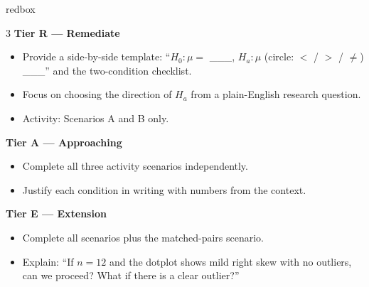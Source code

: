 \documentclass[10pt]{article}
\begin{document}
\begin{skillbox}{redbox}
\begin{multicols}{3}
    \textbf{Tier R --- Remediate}
    \begin{itemize}
        \item Provide a side-by-side template: ``$H_0: \mu =$ \_\_\_, $H_a: \mu$ (circle:
              $<$ / $>$ / $\ne$) \_\_\_'' and the two-condition checklist.
        \item Focus on choosing the direction of $H_a$ from a plain-English research question.
        \item Activity: Scenarios A and B only.
    \end{itemize}
    \columnbreak
    \textbf{Tier A --- Approaching}
    \begin{itemize}
        \item Complete all three activity scenarios independently.
        \item Justify each condition in writing with numbers from the context.
    \end{itemize}
    \columnbreak
    \textbf{Tier E --- Extension}
    \begin{itemize}
        \item Complete all scenarios plus the matched-pairs scenario.
        \item Explain: ``If $n = 12$ and the dotplot shows mild right skew with no outliers,
              can we proceed? What if there is a clear outlier?''
    \end{itemize}
\end{multicols}
\end{skillbox}
\end{document}
